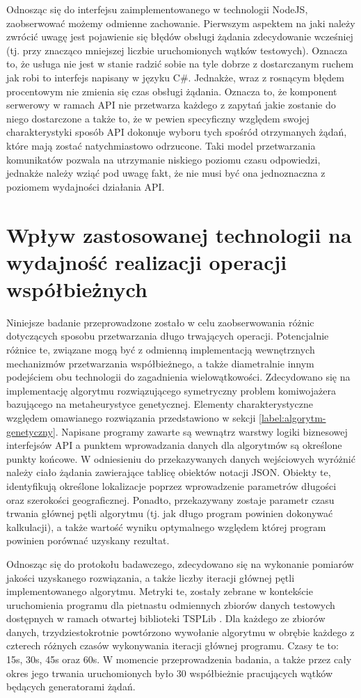Odnosząc się do interfejsu zaimplementowanego w technologii NodeJS, zaobserwować możemy odmienne zachowanie. Pierwszym aspektem na jaki należy zwrócić uwagę jest pojawienie się błędów obsługi żądania zdecydowanie wcześniej (tj. przy znacząco mniejszej liczbie uruchomionych wątków testowych). Oznacza to, że usługa nie jest w stanie radzić sobie na tyle dobrze z dostarczanym ruchem jak robi to interfejs napisany w języku C\#. Jednakże, wraz z rosnącym błędem procentowym nie zmienia się czas obsługi żądania. Oznacza to, że komponent serwerowy w ramach API nie przetwarza każdego z zapytań jakie zostanie do niego dostarczone a także to, że w pewien specyficzny względem swojej charakterystyki sposób API dokonuje wyboru tych spośród otrzymanych żądań, które mają zostać natychmiastowo odrzucone. Taki model przetwarzania komunikatów pozwala na utrzymanie niskiego poziomu czasu odpowiedzi, jednakże należy wziąć pod uwagę fakt, że nie musi być ona jednoznaczna z poziomem wydajności działania API.
\section{Wpływ zastosowanej technologii na wydajność realizacji operacji współbieżnych}
Niniejsze badanie przeprowadzone zostało w celu zaobserwowania różnic dotyczących sposobu przetwarzania długo trwających operacji. Potencjalnie różnice te, związane mogą być z odmienną implementacją wewnętrznych mechanizmów przetwarzania współbieżnego, a także diametralnie innym podejściem obu technologii do zagadnienia wielowątkowości. Zdecydowano się na implementację algorytmu rozwiązującego symetryczny problem komiwojażera bazującego na metaheurystyce genetycznej. Elementy charakterystyczne względem omawianego rozwiązania przedstawiono w sekcji \ref{label:algorytm-genetyczny}. Napisane programy zawarte są wewnątrz warstwy logiki biznesowej interfejsów API a punktem wprowadzania danych dla algorytmów są określone punkty końcowe. W odniesieniu do przekazywanych danych wejściowych wyróżnić należy ciało żądania zawierające tablicę obiektów notacji JSON. Obiekty te, identyfikują określone lokalizacje poprzez wprowadzenie parametrów długości oraz szerokości geograficznej. Ponadto, przekazywany zostaje parametr czasu trwania głównej pętli algorytmu (tj. jak długo program powinien dokonywać kalkulacji), a także wartość wyniku optymalnego względem której program powinien porównać uzyskany rezultat.

Odnosząc się do protokołu badawczego, zdecydowano się na wykonanie pomiarów jakości uzyskanego rozwiązania, a także liczby iteracji głównej pętli implementowanego algorytmu. Metryki te, zostały zebrane w kontekście uruchomienia programu dla pietnastu odmiennych zbiorów danych testowych dostępnych w ramach otwartej biblioteki TSPLib \cite{TSPLIB_ARTICLE}. Dla każdego ze zbiorów danych, trzydziestokrotnie powtórzono wywołanie algorytmu w obrębie każdego z czterech różnych czasów wykonywania iteracji głównej programu. Czasy te to: 15s, 30s, 45s oraz 60s. W momencie przeprowadzenia badania, a także przez cały okres jego trwania uruchomionych było 30 współbieżnie pracujących wątków będących generatorami żądań.

